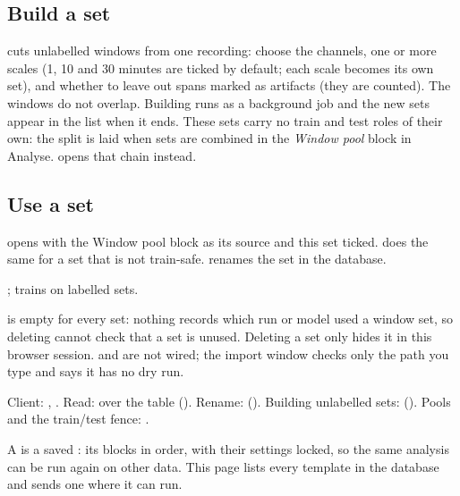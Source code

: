 \subsection{Build a set}\label{sec:library-new-set}
 cuts unlabelled windows from one recording: choose the channels, one or
more scales (1, 10 and 30 minutes are ticked by default; each scale becomes its own set), and
whether to leave out spans marked as artifacts (they are counted). The windows do not overlap.
Building runs as a background job and the new sets appear in the list when it ends. These sets
carry no train and test roles of their own: the split is laid when sets are combined in the
\emph{Window pool} block in Analyse.  opens that chain instead.

\subsection{Use a set}\label{sec:library-use-set}
 opens  with the Window pool block as its
source and this set ticked.  does the same for a set that is not
train-safe.  renames the set in the database.

;  trains on labelled sets.

\begin{watchout}
 is empty for every set: nothing records which run or model used a window set, so
deleting cannot check that a set is unused. Deleting a set only hides it in this browser
session.  and  are not wired; the import window checks only the path
you type and says it has no dry run.
\end{watchout}

\begin{underthehood}
Client: , . Read:
 over the  table
(). Rename: 
(). Building unlabelled sets:  (). Pools and the train/test
fence: .
\end{underthehood}

A  is a saved : its blocks in order, with their
settings locked, so the same analysis can be run again on other data. This page lists every
template in the database and sends one where it can run.

